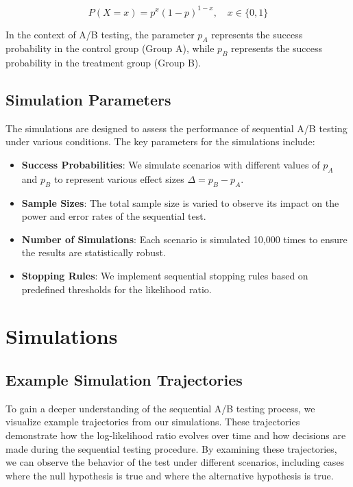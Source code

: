 \documentclass[magisterska, english]{pwr_wmat_praca_dyplomowa}
\theoremstyle{plain}
\numberwithin{theorem}{chapter}
\theoremstyle{definition}
\numberwithin{theorem}{chapter}
\begin{document}
\[
P(X = x) = p^x (1-p)^{1-x}, \quad x \in \{0, 1\}
\]

In the context of A/B testing, the parameter \( p_A \) represents the success probability in the control group (Group A), while \( p_B \) represents the success probability in the treatment group (Group B).

\subsection{Simulation Parameters}

The simulations are designed to assess the performance of sequential A/B testing under various conditions. The key parameters for the simulations include:

\begin{itemize}
	\item \textbf{Success Probabilities}: We simulate scenarios with different values of \( p_A \) and \( p_B \) to represent various effect sizes \( \Delta = p_B - p_A \).
	\item \textbf{Sample Sizes}: The total sample size is varied to observe its impact on the power and error rates of the sequential test.
	\item \textbf{Number of Simulations}: Each scenario is simulated 10,000 times to ensure the results are statistically robust.
	\item \textbf{Stopping Rules}: We implement sequential stopping rules based on predefined thresholds for the likelihood ratio.
\end{itemize}


\section{Simulations}

\subsection{Example Simulation Trajectories}

To gain a deeper understanding of the sequential A/B testing process, we visualize example trajectories from our simulations. These trajectories demonstrate how the log-likelihood ratio evolves over time and how decisions are made during the sequential testing procedure. By examining these trajectories, we can observe the behavior of the test under different scenarios, including cases where the null hypothesis is true and where the alternative hypothesis is true.
\end{document}

